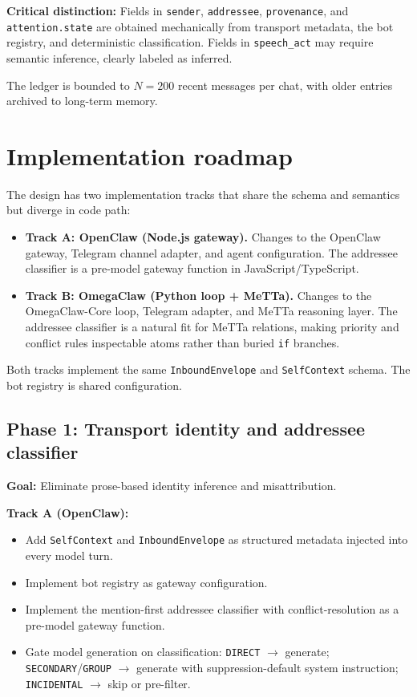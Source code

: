 \documentclass[11pt]{article}
\begin{document}
\textbf{Critical distinction:} Fields in \texttt{sender}, \texttt{addressee},
\texttt{provenance}, and \texttt{attention.state} are obtained mechanically
from transport metadata, the bot registry, and deterministic classification.
Fields in \texttt{speech\_act} may require semantic inference, clearly labeled
as inferred.

The ledger is bounded to $N=200$ recent messages per chat, with older entries
archived to long-term memory.

\section{Implementation roadmap}
\label{sec:roadmap}

The design has two implementation tracks that share the schema and semantics
but diverge in code path:

\begin{itemize}
\item \textbf{Track A: OpenClaw (Node.js gateway).}  Changes to the OpenClaw
gateway, Telegram channel adapter, and agent configuration.  The addressee
classifier is a pre-model gateway function in JavaScript/TypeScript.
\item \textbf{Track B: OmegaClaw (Python loop + MeTTa).}  Changes to the
OmegaClaw-Core loop, Telegram adapter, and MeTTa reasoning layer.  The
addressee classifier is a natural fit for MeTTa relations, making priority and
conflict rules inspectable atoms rather than buried \texttt{if} branches.
\end{itemize}

Both tracks implement the same \texttt{InboundEnvelope} and
\texttt{SelfContext} schema.  The bot registry is shared configuration.

\subsection{Phase 1: Transport identity and addressee classifier}

\textbf{Goal:} Eliminate prose-based identity inference and misattribution.

\textbf{Track A (OpenClaw):}
\begin{itemize}
\item Add \texttt{SelfContext} and \texttt{InboundEnvelope} as structured
metadata injected into every model turn.
\item Implement bot registry as gateway configuration.
\item Implement the mention-first addressee classifier with conflict-resolution
as a pre-model gateway function.
\item Gate model generation on classification:
\texttt{DIRECT} $\to$ generate; \texttt{SECONDARY}/\texttt{GROUP} $\to$
generate with suppression-default system instruction;
\texttt{INCIDENTAL} $\to$ skip or pre-filter.
\end{itemize}
\end{document}
